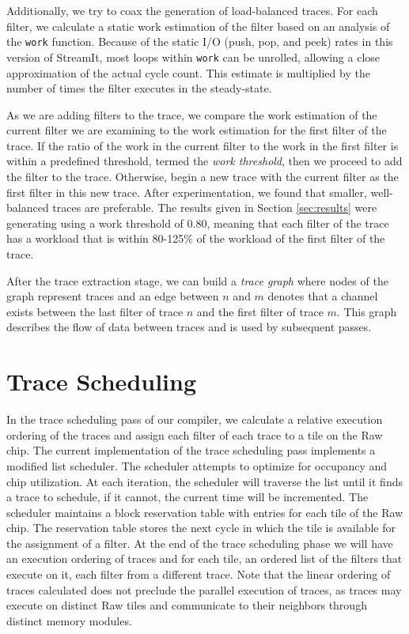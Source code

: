 
Additionally, we try to coax the generation of load-balanced traces.
For each filter, we calculate a static work estimation of the filter
based on an analysis of the {\tt work} function.  Because of the
static I/O (push, pop, and peek) rates in this version of StreamIt,
most loops within {\tt work} can be unrolled, allowing a close
approximation of the actual cycle count.  This estimate is multiplied
by the number of times the filter executes in the steady-state.

As we are adding filters to the trace, we compare the work estimation
of the current filter we are examining to the work estimation for the
first filter of the trace.  If the ratio of the work in the current
filter to the work in the first filter is within a predefined
threshold, termed the {\it work threshold}, then we proceed to add the
filter to the trace.  Otherwise, begin a new trace with the current
filter as the first filter in this new trace.  After experimentation,
we found that smaller, well-balanced traces are preferable.  The
results given in Section \ref{sec:results} were generating using a
work threshold of 0.80, meaning that each filter of the trace has a
workload that is within 80-125\% of the workload of the first filter
of the trace.

After the trace extraction stage, we can build a {\it trace graph}
where nodes of the graph represent traces and an edge between $n$ and
$m$ denotes that a channel exists between the last filter of trace $n$
and the first filter of trace $m$. This graph describes the flow of data
between traces and is used by subsequent passes.

\section{Trace Scheduling}
In the trace scheduling pass of our compiler, we calculate a relative
execution ordering of the traces and assign each filter of each trace
to a tile on the Raw chip.  The current implementation of the trace
scheduling pass implements a modified list scheduler. The scheduler
attempts to optimize for occupancy and chip utilization.  At each
iteration, the scheduler will traverse the list until it finds a trace
to schedule, if it cannot, the current time will be incremented.  The
scheduler maintains a block reservation table with entries for each
tile of the Raw chip.  The reservation table stores the next cycle in
which the tile is available for the assignment of a filter.  At the
end of the trace scheduling phase we will have an execution ordering of
traces and for each tile, an ordered list of the filters that execute
on it, each filter from a different trace. Note that the linear
ordering of traces calculated does not preclude the parallel execution
of traces, as traces may execute on distinct Raw tiles and communicate
to their neighbors through distinct memory modules.

